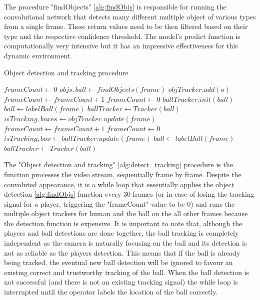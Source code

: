 \documentclass[
    11pt,
    oneside
]{report}
\begin{document}
The procedure "findObjects" \ref{alg:findObjs} is responsible for running the convolutional network that detects many different multiple object of various types from a single frame. These return values need to be then filtered based on their type and the respective confidence threshold. The model's predict function is computationally very intensive but it has an impressive effectiveness for this dynamic environment.


\begin{algorithm}[H]
\begin{algorithmic}
\caption{Object detection and tracking procedure}\label{alg:detect_tracking}
\State $frameCount \gets 0$
        \State $objs, ball \gets findObjects(frame)$
                \State $objTracker.add(o)$
            \EndFor
            \State $frameCount \gets frameCount + 1$
        \Else
            \State $frameCount \gets 0$
        \EndIf
            \State $ballTracker.init(ball)$
        \Else
            \State $ball \gets labelBall(frame)$
            \State $ballTracker \gets Tracker(ball)$
        \EndIf
    \Else
        \State $isTracking, boxes \gets objTracker.update(frame)$
            \State $frameCount \gets frameCount + 1$
        \Else
            \State $frameCount \gets 0$
        \EndIf
        \State $isTracking, box \gets ballTracker.update(frame)$
            \State $ball \gets labelBall(frame)$
            \State $ballTracker \gets Tracker(ball)$
        \EndIf
    \EndIf
\EndFor
\end{algorithmic}
\end{algorithm}




The "Object detection and tracking" \ref{alg:detect_tracking} procedure is the function processes the video stream, sequentially frame by frame. Despite the convoluted appearance, it is a while loop that essentially applies the object detection \ref{alg:findObjs} function every 30 frames (or in case of losing the tracking signal for a player, triggering the "frameCount" value to be 0) and runs the multiple object trackers for human and the ball on the all other frames because the detection function is expensive. It is important to note that, although the players and ball detections are done together, the ball tracking is completely independent as the camera is naturally focusing on the ball and its detection is not as reliable as the players detection. This means that if the ball is already being tracked, the eventual new ball detection will be ignored to favour an existing correct and trustworthy tracking of the ball. When the ball detection is not successful (and there is not an existing tracking signal) the while loop is interrupted until the operator labels the location of the ball correctly.
\end{document}
